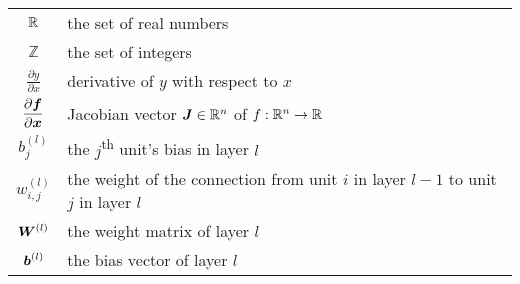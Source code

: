 \documentclass[../report.tex]{subfiles}
\begin{document}
\begin{tabular}{cl}
    $\displaystyle \mathbb{R}$ & the set of real numbers\\
    $\displaystyle \mathbb{Z}$ & the set of integers\\
    $\displaystyle \frac{\partial y}{\partial x}$ & derivative of $y$ with respect to $x$\\
    $\displaystyle \frac{\partial {\bm{f}}}{\partial {\bm{x}}}$ & Jacobian vector ${\bm{J}}\in \mathbb{R}^n$ of $f:\mathbb{R}^n\to\mathbb{R}$\\
    $\displaystyle b_j^{(l)}$ & the $j$\textsuperscript{th} unit's bias in layer $l$\\
    $\displaystyle w_{i,j}^{(l)}$ & the weight of the connection from unit $i$ in layer $l-1$ to unit $j$ in layer $l$\\
    $\displaystyle {\bm{W}}^{(l)}$ & the weight matrix of layer $l$\\
    $\displaystyle {\bm{b}}^{(l)}$ & the bias vector of layer $l$
\end{tabular}
\end{document}
